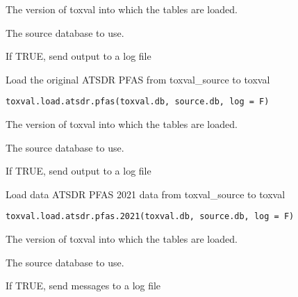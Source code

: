 \documentclass[letterpaper]{book}
\begin{document}
%
\begin{Arguments}
\begin{ldescription}
\item[\code{toxval.db}] The version of toxval into which the tables are loaded.

\item[\code{source.db}] The source database to use.

\item[\code{log}] If TRUE, send output to a log file
\end{ldescription}
\end{Arguments}
%
\begin{Description}\relax
Load the original ATSDR PFAS from toxval\_source to toxval
\end{Description}
%
\begin{Usage}
\begin{verbatim}
toxval.load.atsdr.pfas(toxval.db, source.db, log = F)
\end{verbatim}
\end{Usage}
%
\begin{Arguments}
\begin{ldescription}
\item[\code{toxval.db}] The version of toxval into which the tables are loaded.

\item[\code{source.db}] The source database to use.

\item[\code{log}] If TRUE, send output to a log file
\end{ldescription}
\end{Arguments}
%
\begin{Description}\relax
Load data ATSDR PFAS 2021 data from toxval\_source to toxval
\end{Description}
%
\begin{Usage}
\begin{verbatim}
toxval.load.atsdr.pfas.2021(toxval.db, source.db, log = F)
\end{verbatim}
\end{Usage}
%
\begin{Arguments}
\begin{ldescription}
\item[\code{toxval.db}] The version of toxval into which the tables are loaded.

\item[\code{source.db}] The source database to use.

\item[\code{log}] If TRUE, send messages to a log file
\end{ldescription}
\end{Arguments}
\end{document}
